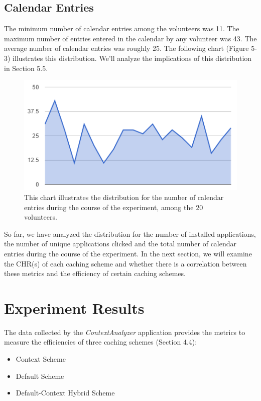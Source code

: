 \documentclass[12pt]{uthesis-v12}  %
\begin{document}
			\subsection{Calendar Entries}
				The minimum number of calendar entries among the volunteers was 11. The maximum number of entries entered in the calendar by any volunteer was 43. The average number of calendar entries was roughly 25. The following chart (Figure 5-3) illustrates this distribution. We'll analyze the implications of this distribution in Section 5.5. 
				
				\begin{figure}[h]
					\centering
					\includegraphics[width = 130mm]{images/calendarEntries.png}
					\caption[Distribution of Number of Calendar Entries]{This chart illustrates the distribution for the number of calendar entries during the course of the experiment, among the 20 volunteers.}
				\end{figure}		
			
			So far, we have analyzed the distribution for the number of installed applications, the number of unique applications clicked and the total number of calendar entries during the course of the experiment. In the next section, we will examine the CHR(s) of each caching scheme and whether there is a correlation between these metrics and the efficiency of certain caching schemes.
			
		\section{Experiment Results}
			The data collected by the {\em ContextAnalyzer} application provides the metrics to measure the efficiencies of three caching schemes (Section 4.4):
			
			\begin{itemize}
				\item Context Scheme
				\item Default Scheme
				\item Default-Context Hybrid Scheme
			\end{itemize}
			
\end{document}
